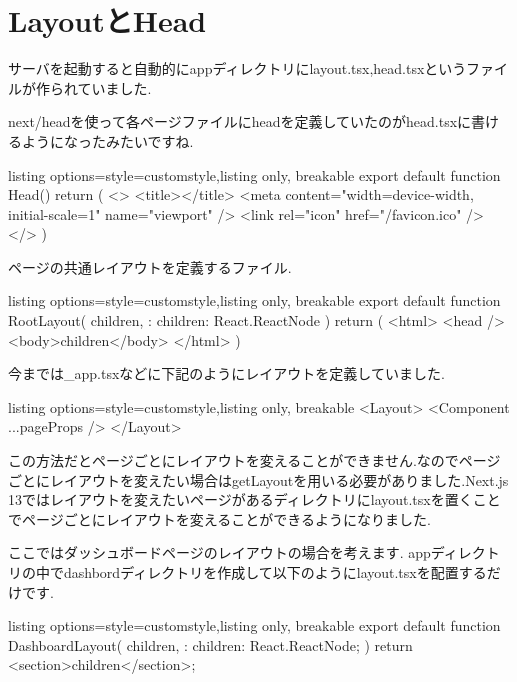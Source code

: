 \section{LayoutとHead}

サーバを起動すると自動的にappディレクトリにlayout.tsx,head.tsxというファイルが作られていました.

next/headを使って各ページファイルにheadを定義していたのがhead.tsxに書けるようになったみたいですね.

\begin{tcblisting}{listing options={style=customstyle},listing only, breakable}
  export default function Head() {
      return (
      <>
      <title></title>
      <meta content="width=device-width, initial-scale=1" name="viewport" />
      <link rel="icon" href="/favicon.ico" />
      </>
      )
    }
\end{tcblisting}



ページの共通レイアウトを定義するファイル.




\begin{tcblisting}{listing options={style=customstyle},listing only, breakable}
  export default function RootLayout({
      children,
    }: {
  children: React.ReactNode
  }) {
      return (
      <html>
        <head />
        <body>{children}</body>
      </html>
      )
    }

\end{tcblisting}


今までは\_app.tsxなどに下記のようにレイアウトを定義していました.
\begin{tcblisting}{listing options={style=customstyle},listing only, breakable}
  <Layout>
  <Component {...pageProps} />
  </Layout>
\end{tcblisting}




この方法だとページごとにレイアウトを変えることができません.なのでページごとにレイアウトを変えたい場合はgetLayoutを用いる必要がありました.Next.js 13ではレイアウトを変えたいページがあるディレクトリにlayout.tsxを置くことでページごとにレイアウトを変えることができるようになりました.


ここではダッシュボードページのレイアウトの場合を考えます.
appディレクトリの中でdashbordディレクトリを作成して以下のようにlayout.tsxを配置するだけです.


\begin{tcblisting}{listing options={style=customstyle},listing only, breakable}
  export default function DashboardLayout({
      children,
    }: {
  children: React.ReactNode;
  }) {
      return <section>{children}</section>;
    }
\end{tcblisting}




